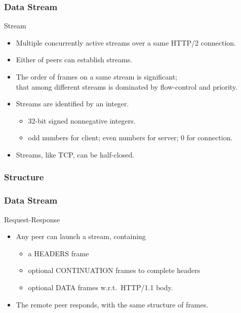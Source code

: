 \documentclass[lualatex]{beamer}
\begin{document}
\begin{frame}
  \frametitle{Data Stream}

  \begin{block}{Stream}
    \begin{itemize}
    \item Multiple concurrently active streams over a same HTTP/2 connection.
    \item Either of peers can establish streams.
    \item The order of frames on a same stream is significant;\\
      that among different streams is dominated by flow-control and priority.
    \item Streams are identified by an integer.
      \begin{itemize}
      \item 32-bit signed nonnegative integers.
      \item odd numbers for client; even numbers for server; 0 for connection.
      \end{itemize}
    \item Streams, like TCP, can be half-closed.
    \end{itemize}
  \end{block}
\end{frame}

\subsubsection{Structure}

\begin{frame}
  \frametitle{Data Stream}

  \begin{block}{Request-Response}
    \begin{itemize}
    \item Any peer can launch a stream, containing
      \begin{itemize}
      \item a HEADERS frame
      \item optional CONTINUATION frames to complete headers
      \item optional DATA frames w.r.t.\ HTTP/1.1 body.
      \end{itemize}
    \item The remote peer responds, with the same structure of frames. 
    \end{itemize}
  \end{block}
\end{frame}
\end{document}
